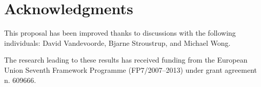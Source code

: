 \section*{Acknowledgments}

This proposal has been improved thanks to discussions with the following individuals:
David Vandevoorde,
Bjarne Stroustrup, and
Michael Wong.

The research leading to these results has received funding from the European
Union Seventh Framework Programme (FP7/2007--2013) under grant agreement n.
609666.

